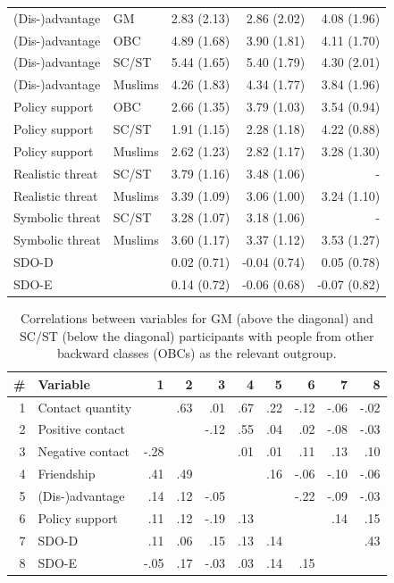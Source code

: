 \documentclass[12pt, a4paper]{article}
\begin{document}
\begin{table}[!hp]
\begin{tabular}{llrrr}
  (Dis-)advantage & GM & 2.83 (2.13) & 2.86 (2.02) & 4.08 (1.96) \\ 
  (Dis-)advantage & OBC & 4.89 (1.68) & 3.90 (1.81) & 4.11 (1.70) \\ 
  (Dis-)advantage & SC/ST & 5.44 (1.65) & 5.40 (1.79) & 4.30 (2.01) \\ 
  (Dis-)advantage & Muslims & 4.26 (1.83) & 4.34 (1.77) & 3.84 (1.96) \\ \addlinespace
  Policy support & OBC & 2.66 (1.35) & 3.79 (1.03) & 3.54 (0.94) \\ 
  Policy support & SC/ST & 1.91 (1.15) & 2.28 (1.18) & 4.22 (0.88) \\ 
  Policy support & Muslims & 2.62 (1.23) & 2.82 (1.17) & 3.28 (1.30) \\ \addlinespace
  Realistic threat & SC/ST & 3.79 (1.16) & 3.48 (1.06) & - \\ 
  Realistic threat & Muslims & 3.39 (1.09) & 3.06 (1.00) & 3.24 (1.10) \\ \addlinespace
  Symbolic threat & SC/ST & 3.28 (1.07) & 3.18 (1.06) & - \\ 
  Symbolic threat & Muslims & 3.60 (1.17) & 3.37 (1.12) & 3.53 (1.27) \\ \addlinespace
  SDO-D &  & 0.02 (0.71) & -0.04 (0.74) & 0.05 (0.78) \\ 
  SDO-E &  & 0.14 (0.72) & -0.06 (0.68) & -0.07 (0.82) \\  \bottomrule
\end{tabular}
\label{tab:c-1}
\end{table}


\begin{table}[!hp]
\centering
{}
\caption{Correlations between variables for GM (above the diagonal) and SC/ST (below the diagonal) participants with people from other backward classes (OBCs) as the relevant outgroup.}
\small	
\begin{tabular}{rlrrrrrrrr} \toprule
\# & Variable & 1 & 2 & 3 & 4 & 5 & 6 & 7 & 8 \\ \midrule 
1 & Contact quantity &  &  .63 &  .01 &  .67 &  .22 & -.12 & -.06 & -.02 \\ 
  2 & Positive contact &  &  & -.12 &  .55 &  .04 &  .02 & -.08 & -.03 \\ 
  3 & Negative contact & -.28 &  &  &  .01 &  .01 &  .11 &  .13 &  .10 \\ 
  4 & Friendship &  .41 &  .49 &  &  &  .16 & -.06 & -.10 & -.06 \\ 
  5 & (Dis-)advantage &  .14 &  .12 & -.05 &  &  & -.22 & -.09 & -.03 \\ 
  6 & Policy support &  .11 &  .12 & -.19 &  .13 &  &  &  .14 &  .15 \\ 
  7 & SDO-D &  .11 &  .06 &  .15 &  .13 &  .14 &  &  &  .43 \\ 
  8 & SDO-E & -.05 &  .17 & -.03 &  .03 &  .14 &  .15 &  &  \\ 
\bottomrule
\end{tabular}
\label{tab:c-2}
\end{table}
\end{document}
